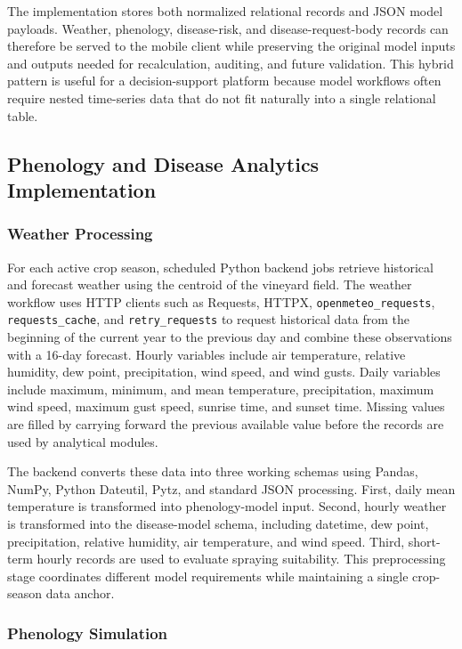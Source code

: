 \documentclass[11pt,a4paper]{article}
\begin{document}
The implementation stores both normalized relational records and JSON model payloads. Weather, phenology, disease-risk, and disease-request-body records can therefore be served to the mobile client while preserving the original model inputs and outputs needed for recalculation, auditing, and future validation. This hybrid pattern is useful for a decision-support platform because model workflows often require nested time-series data that do not fit naturally into a single relational table.

\subsection{Phenology and Disease Analytics Implementation}

\subsubsection{Weather Processing}

For each active crop season, scheduled Python backend jobs retrieve historical and forecast weather using the centroid of the vineyard field. The weather workflow uses HTTP clients such as Requests, HTTPX, \texttt{openmeteo\_requests}, \texttt{requests\_cache}, and \texttt{retry\_requests} to request historical data from the beginning of the current year to the previous day and combine these observations with a 16-day forecast. Hourly variables include air temperature, relative humidity, dew point, precipitation, wind speed, and wind gusts. Daily variables include maximum, minimum, and mean temperature, precipitation, maximum wind speed, maximum gust speed, sunrise time, and sunset time. Missing values are filled by carrying forward the previous available value before the records are used by analytical modules.

The backend converts these data into three working schemas using Pandas, NumPy, Python Dateutil, Pytz, and standard JSON processing. First, daily mean temperature is transformed into phenology-model input. Second, hourly weather is transformed into the disease-model schema, including datetime, dew point, precipitation, relative humidity, air temperature, and wind speed. Third, short-term hourly records are used to evaluate spraying suitability. This preprocessing stage coordinates different model requirements while maintaining a single crop-season data anchor.

\subsubsection{Phenology Simulation}
\end{document}
